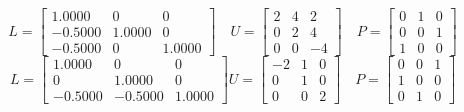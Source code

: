 \documentclass[UTF8]{ctexart}
\begin{document}
\begin{equation*}L = \begin{bmatrix} 1.0000 &  0  & 0\\   -0.5000    &1.0000        & 0\\-0.5000  &  0    &1.0000\end{bmatrix}\quad U =\begin{bmatrix} 2  &   4     &2\\    0   &  2   &  4\\      0  &   0     &-4\end{bmatrix}\quad P=\begin{bmatrix} 0   &  1     &0\\ 0    & 0   & 1\\ 1  & 0  &  0
\end{bmatrix}
\end{equation*}
\begin{equation*}L = \begin{bmatrix} 1.0000 &   0  & 0\\   0    &1.0000        & 0\\-0.5000  &  -0.5000    &1.0000\end{bmatrix} U =\begin{bmatrix} -2  &   1     &0\\    0     &1   &  0\\     0   &  0     &2\end{bmatrix}\quad P=\begin{bmatrix} 0     &0  &   1\\ 1    & 0   & 0\\ 0 & 1  &  0
\end{bmatrix}
\end{equation*}
\end{document}
